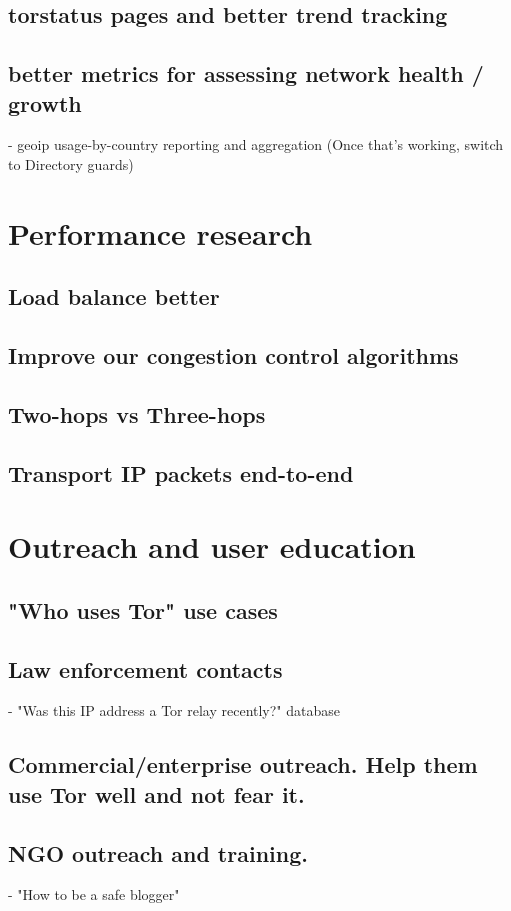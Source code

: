\documentclass{article}
\begin{document}
\subsection{torstatus pages and better trend tracking}
\subsection{better metrics for assessing network health / growth}
      - geoip usage-by-country reporting and aggregation
        (Once that's working, switch to Directory guards)
\section{Performance research}
\subsection{Load balance better}
\subsection{Improve our congestion control algorithms}
\subsection{Two-hops vs Three-hops}
\subsection{Transport IP packets end-to-end}
\section{Outreach and user education}
\subsection{"Who uses Tor" use cases}
\subsection{Law enforcement contacts}
      - "Was this IP address a Tor relay recently?" database
\subsection{Commercial/enterprise outreach. Help them use Tor well and
      not fear it.}
\subsection{NGO outreach and training.}
      - "How to be a safe blogger"
\end{document}
